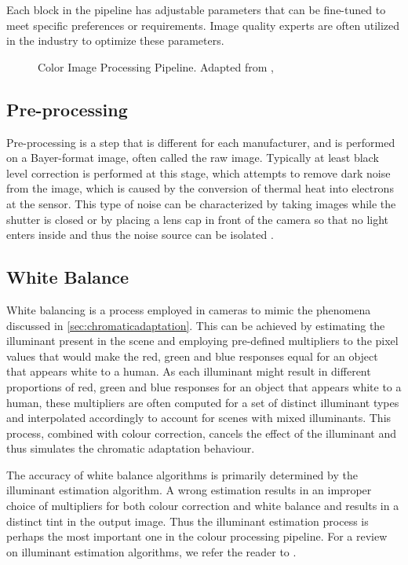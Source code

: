 Each block in the pipeline has adjustable parameters that can be fine-tuned to meet specific preferences or requirements. Image quality experts are often utilized in the industry to optimize these parameters. 

\begin{figure}
\centering

\caption{Color Image Processing Pipeline. Adapted from \cite{Ramanath}, \cite{JianpingZhou2007IPTf}}
\label{fig:dip}
\end{figure}


\subsection{Pre-processing}

Pre-processing is a step that is different for each manufacturer, and is performed on a Bayer-format image, often called the raw image. Typically at least black level correction is performed at this stage, which attempts to remove dark noise from the image, which is caused by the conversion of thermal heat into electrons at the sensor. This type of noise can be characterized by taking images while the shutter is closed or by placing a lens cap in front of the camera so that no light enters inside and thus the noise source can be isolated \cite{Ramanath}.

\subsection{White Balance}

White balancing is a process employed in cameras to mimic the phenomena discussed in \ref{sec:chromaticadaptation}. This can be achieved by estimating the illuminant present in the scene and employing pre-defined multipliers to the pixel values that would make the red, green and blue responses equal for an object that appears white to a human. As each illuminant might result in different proportions of red, green and blue responses for an object that appears white to a human, these multipliers are often computed for a set of distinct illuminant types and interpolated accordingly to account for scenes with mixed illuminants. This process, combined with colour correction, cancels the effect of the illuminant and thus simulates the chromatic adaptation behaviour. \cite[ch.~4.6]{rowlands2020physics}

The accuracy of white balance algorithms is primarily determined by the illuminant estimation algorithm. A wrong estimation results in an improper choice of multipliers for both colour correction and white balance and results in a distinct tint in the output image. Thus the illuminant estimation process is perhaps the most important one in the colour processing pipeline. For a review on illuminant estimation algorithms, we refer the reader to \cite{colourconstancy}.

